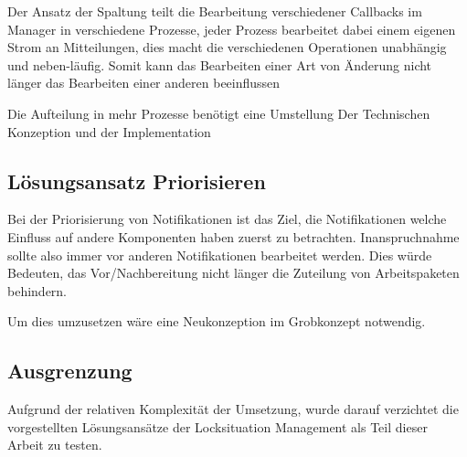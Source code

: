 Der Ansatz der Spaltung teilt die Bearbeitung verschiedener Callbacks im Manager
in verschiedene Prozesse, jeder Prozess bearbeitet dabei einem eigenen Strom an Mitteilungen, dies macht die verschiedenen Operationen unabhängig und neben-läufig.
Somit kann das Bearbeiten einer Art von Änderung nicht länger das Bearbeiten einer anderen beeinflussen 

Die Aufteilung in mehr Prozesse benötigt eine Umstellung Der Technischen Konzeption und der Implementation

\subsection{Lösungsansatz Priorisieren}

Bei der Priorisierung von Notifikationen ist das Ziel,
die Notifikationen welche Einfluss auf andere Komponenten haben zuerst zu betrachten.
Inanspruchnahme sollte also immer vor anderen Notifikationen bearbeitet werden.
Dies würde Bedeuten, das Vor/Nachbereitung nicht länger die Zuteilung von Arbeitspaketen behindern.

Um dies umzusetzen wäre eine Neukonzeption im Grobkonzept notwendig.


\subsection{Ausgrenzung}

Aufgrund der relativen Komplexität der Umsetzung,
wurde darauf verzichtet die vorgestellten Lösungsansätze der Locksituation Management
als Teil dieser Arbeit zu testen.

